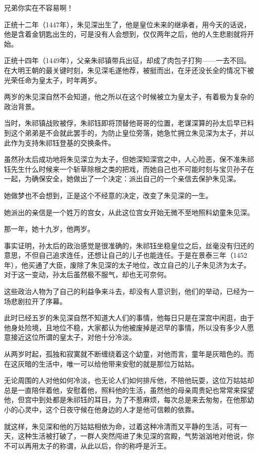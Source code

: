 \begin{multicols}{\theparacolNo}
		兄弟你实在不容易啊！

		正统十二年（1447年），朱见深出生了，他是皇位未来的继承者，用今天的话说，他是含着金钥匙出生的，可是没有人会想到，仅仅两年之后，他的人生悲剧就将开始。

		正统十四年（1449年），父亲朱祁镇带兵出征，却成了肉包子打狗——一去不回。在大明王朝的最关键时刻，朱见深毛遂他荐，被挺而出，在牙还没长全的情况下被光荣任命为皇太子，时年两岁。

		两岁的朱见深自然不会知道，他之所以在这个时候被立为皇太子，有着极为复杂的政治背景。

		当时，朱祁镇战败被俘，朱祁钰即将顶替他哥哥的位置，老谋深算的孙太后早已料到这个弟弟是不会就此罢手的，为防止皇位旁落，她急忙拥立朱见深为太子，并以此作为支持朱祁钰登基的交换条件。

		虽然孙太后成功地将朱见深立为太子，但她深知深宫之中，人心险恶，保不准朱祁钰先生什么时候来一个斩草除根之类的把戏，而她自己也不可能时刻与宝贝孙子在一起，为确保安全，她做出了一个决定：派出自己的一个亲信去保护朱见深。

		她做梦也不会想到，正是这个不经意的决定，改变了朱见深的一生。

		她派出的亲信是一个姓万的宫女，从此这位宫女开始无微不至地照料幼童朱见深。

		那一年，她十九岁，他两岁。

		事实证明，孙太后的政治感觉是很准确的，朱祁钰坐稳皇位之后，丝毫没有归还的意思，不但自己追求连任，还想让自己的儿子也能连任。于是在景泰三年（1452年），他买通了大臣，废除了朱见深的太子地位，改立自己的儿子朱见济为太子。对于这一变动，孙太后虽然极不服气，却也无可奈何。

		这些政治人物为了自己的利益争来斗去，却没有人意识到，他们的举动，已经为一场悲剧拉开了序幕。

		此时已经五岁的朱见深自然不知道大人们的事情，他每日只是在深宫中闲逛，由于他身处险境，且地位不稳，大家都认为他被废掉是迟早的事情，所以没有多少人愿意接近这位所谓的皇太子，对他十分冷淡。

		从两岁时起，孤独和寂寞就不断缠绕着这个幼童，对他而言，童年是灰暗色的。而在这灰暗的生活中，唯一可以给他带来安慰的就是那位万姑姑。

		无论周围的人对他如何冷淡，也无论人们如何排斥他，不陪他玩耍，这位万姑姑却总是一直陪伴着他，安慰着他，照料他的生活，虽然他的母亲周贵妃也常常来探望他，但宫中到处都是朱祁钰的耳目，为了不惹麻烦，每次总是来去匆匆，在他那幼小的心灵中，这个日夜守候在他身边的人才是他可信赖的依靠。

		就这样，朱见深和他的万姑姑相依为命，过着这种冷清而又平静的生活，可有一天，这种生活被打破了，一群人突然闯进了朱见深的宫殿，气势汹汹地对他说，你不可以再用太子的称谓，从此以后，你的称呼是沂王。


\end{multicols}
